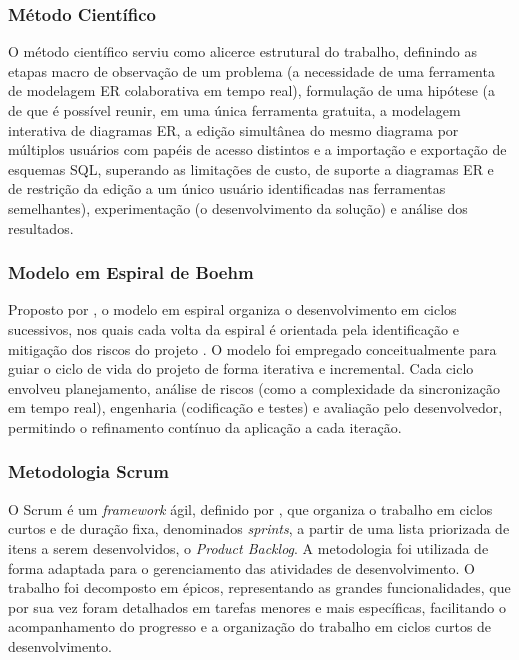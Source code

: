 \subsubsection[Método Científico]{Método Científico}
O método científico serviu como alicerce estrutural do trabalho, definindo as etapas macro de observação de um problema (a necessidade de uma ferramenta de modelagem ER colaborativa em tempo real), formulação de uma hipótese (a de que é possível reunir, em uma única ferramenta gratuita, a modelagem interativa de diagramas ER, a edição simultânea do mesmo diagrama por múltiplos usuários com papéis de acesso distintos e a importação e exportação de esquemas SQL, superando as limitações de custo, de suporte a diagramas ER e de restrição da edição a um único usuário identificadas nas ferramentas semelhantes), experimentação (o desenvolvimento da solução) e análise dos resultados.

\subsubsection[Modelo em Espiral de Boehm]{Modelo em Espiral de Boehm}
Proposto por , o modelo em espiral organiza o desenvolvimento em ciclos sucessivos, nos quais cada volta da espiral é orientada pela identificação e mitigação dos riscos do projeto \cite{EngenhariaSoftware2021}. O modelo foi empregado conceitualmente para guiar o ciclo de vida do projeto de forma iterativa e incremental. Cada ciclo envolveu planejamento, análise de riscos (como a complexidade da sincronização em tempo real), engenharia (codificação e testes) e avaliação pelo desenvolvedor, permitindo o refinamento contínuo da aplicação a cada iteração.

\subsubsection[Metodologia Scrum]{Metodologia Scrum}
O Scrum é um \textit{framework} ágil, definido por , que organiza o trabalho em ciclos curtos e de duração fixa, denominados \textit{sprints}, a partir de uma lista priorizada de itens a serem desenvolvidos, o \textit{Product Backlog}. A metodologia foi utilizada de forma adaptada para o gerenciamento das atividades de desenvolvimento. O trabalho foi decomposto em épicos, representando as grandes funcionalidades, que por sua vez foram detalhados em tarefas menores e mais específicas, facilitando o acompanhamento do progresso e a organização do trabalho em ciclos curtos de desenvolvimento.

